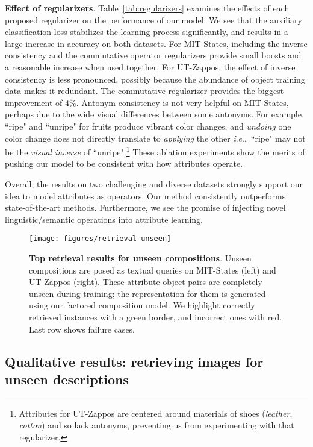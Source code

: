 \documentclass[runningheads]{llncs}
\newcommand{\ie}{\textit{i}.\textit{e}.,~}
\newcommand{\reftbl}[1]{Table~\ref{#1}}
\begin{document}
\vspace{0.05in}
\noindent\textbf{Effect of regularizers}. \reftbl{tab:regularizers} examines the effects of each proposed regularizer on the performance of our model. 
We see that the auxiliary classification loss stabilizes the learning process significantly, and results in a large increase in accuracy on both datasets. For MIT-States, including the inverse consistency and the commutative operator regularizers provide small boosts and a reasonable increase when used together. For UT-Zappos, the effect of inverse consistency is less pronounced, possibly because the abundance of object training data makes it redundant. The commutative regularizer provides the biggest improvement of 4\%. Antonym consistency is not very helpful on MIT-States, perhaps due to the wide visual differences between some antonyms. For example, ``ripe" and ``unripe" for fruits produce vibrant color changes, and \emph{undoing} one color change does not directly translate to \emph{applying} the other \ie ``ripe" may not be the \emph{visual inverse} of ``unripe".\footnote{Attributes for UT-Zappos are centered around materials of shoes (\emph{leather}, \emph{cotton}) and so lack antonyms, preventing us from experimenting with that regularizer.} These ablation experiments show the merits of pushing our model to be consistent with how attributes operate.

Overall, the results on two challenging and diverse datasets strongly support our idea to model attributes as operators.  Our method consistently outperforms state-of-the-art methods. Furthermore, we see the promise of injecting novel linguistic/semantic operations into attribute learning.  

\begin{figure}[t]
\centering
\texttt{[image: figures/retrieval-unseen]}
\vspace{-0.25in}
\caption{ \textbf{Top retrieval results for unseen compositions}. Unseen compositions are posed as textual queries on MIT-States (left) and UT-Zappos (right). These attribute-object pairs are completely unseen during training; the representation for them is generated using our factored composition model. 
We highlight correctly retrieved instances with a green border, and incorrect ones with red. Last row shows failure cases.} 
\label{fig:retrival-unseen}
\vspace{-0.2in}
\end{figure}


\subsection{Qualitative results: retrieving images for unseen descriptions}
\end{document}
